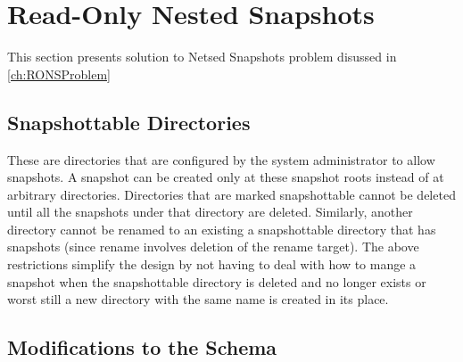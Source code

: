 
%
%
%


\chapter{Read-Only Nested Snapshots}
\label{ch:RONSSolution}

This section presents solution to Netsed Snapshots problem disussed in \ref{ch:RONSProblem}
\section{Snapshottable Directories}

 These are directories that are configured
by the system administrator to allow snapshots. A snapshot can be created only at these snapshot roots
instead of at arbitrary directories.
Directories that are marked snapshottable cannot be deleted until all the snapshots under that directory
are deleted. Similarly, another directory cannot be renamed to an existing a snapshottable directory
that has snapshots (since rename involves deletion of the rename target). The above restrictions
simplify the design by not having to deal with how to mange a snapshot when the snapshottable
directory is deleted and no longer exists or worst still a new directory with the same name is created in
its place.

\section{Modifications to the Schema}
\label{RONSS:schema}

